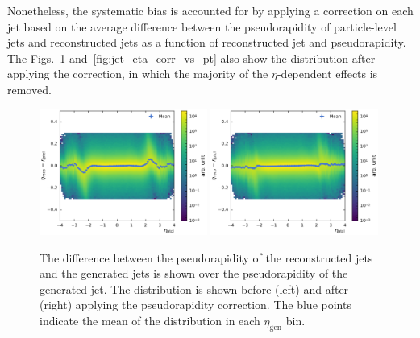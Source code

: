 Nonetheless, the systematic bias is accounted for by applying a correction on
each jet based on the average difference between the pseudorapidity of
particle-level jets and reconstructed jets as a function of reconstructed jet
\pt and pseudorapidity. The Figs.~\ref{fig:jet_eta_corr}
and~\ref{fig:jet_eta_corr_vs_pt} also show the distribution after applying the
correction, in which the majority of the $\eta$-dependent effects is removed.

\begin{figure}[htbp]
    \centering
    \includegraphics[width=0.49\textwidth]{figures/measurement/genvsreco_eta.pdf}\hfill
    \includegraphics[width=0.49\textwidth]{figures/measurement/genvsreco_eta_corr.pdf}
    \caption[Differences of pseudorapidity of reconstructed jets to
        particle-level jets]{The difference between the pseudorapidity of the
            reconstructed jets and the generated jets is shown over the
            pseudorapidity of the generated jet. The distribution is shown
            before (left) and after (right) applying the pseudorapidity
            correction. The blue points indicate the mean of the distribution in
            each $\eta_{\mathrm{gen}}$ bin.}
    \label{fig:jet_eta_corr}
\end{figure}


